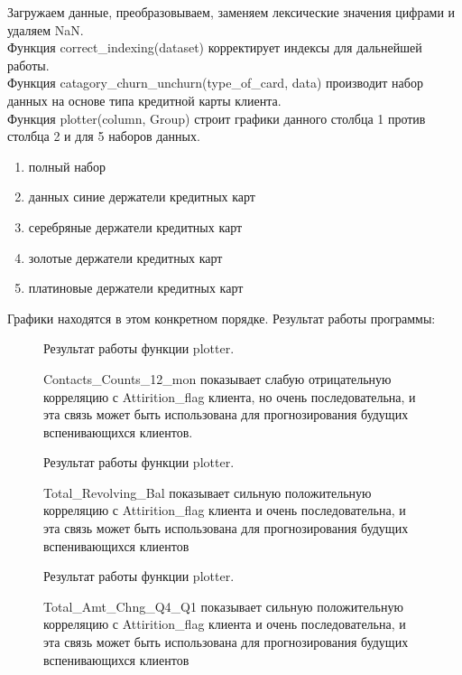 \documentclass[12pt,a4paper,preview]{article}
\begin{document}
Загружаем данные, преобразовываем, заменяем лексические значения цифрами и удаляем NaN.\\
Функция correct\_indexing(dataset) корректирует индексы для дальнейшей работы.\\
Функция catagory\_churn\_unchurn(type\_of\_card, data) производит набор данных на основе типа кредитной карты клиента.\\
Функция plotter(column, Group) строит графики данного столбца 1 против столбца 2 и для 5 наборов данных.
\begin{enumerate}
\item полный набор
\item данных синие держатели кредитных карт
\item серебряные держатели кредитных карт
\item золотые держатели кредитных карт
\item платиновые держатели кредитных карт
\end{enumerate}
Графики находятся в этом конкретном порядке.
Результат работы программы:
\\

\begin{figure}[h!] 
\caption{Результат работы функции plotter.}
\end{figure}
\begin{figure}
\caption{Contacts\_Counts\_12\_mon показывает слабую отрицательную корреляцию с Attirition\_flag клиента, но очень последовательна, и эта связь может быть использована для прогнозирования будущих вспенивающихся клиентов.}
\end{figure}
\begin{figure}
\caption{Результат работы функции plotter.}
\end{figure}
\begin{figure}
\caption{Total\_Revolving\_Bal показывает сильную положительную корреляцию с Attirition\_flag клиента и очень последовательна, и эта связь может быть использована для прогнозирования будущих вспенивающихся клиентов}
\end{figure}
\begin{figure}
\caption{Результат работы функции plotter.}
\end{figure}
\begin{figure}
\caption{Total\_Amt\_Chng\_Q4\_Q1 показывает сильную положительную корреляцию с Attirition\_flag клиента и очень последовательна, и эта связь может быть использована для прогнозирования будущих вспенивающихся клиентов}
\end{figure}
\end{document}
